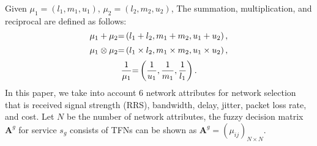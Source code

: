 \documentclass[conference]{IEEEtran}
\begin{document}
\begin{comment}
	\begin{equation}   
	\label{equ1}
	\mu (x) = \left\{ \begin{array}{l}
	\frac{{x - l}}{{m - l}}\;\;,\;l \le x \le m  ,\\
	\frac{{u - x}}{{u - m}}\;\;,m \le x \le u    ,\\
	0\;\;\;\;\;\;\;\;,\rm otherwise     .
	\end{array} \right. 
	\end{equation}content...
\end{comment}
Given $\mu_1=(l_1,m_1,u_1)$, $\mu_2=(l_2,m_2,u_2)$, 
The summation, multiplication, and reciprocal are defined as follows:
\begin{equation}   
\label{equ2}
{\mu _1} + {\mu _2}{\rm{ = }}\left( {{l_1} + {l_2},{m_1} + {m_2},{u_1} + {u_2}} \right) ,
\end{equation}
\begin{equation}   
\label{equ3}
{\mu _1} \otimes {\mu _2}{\rm{ = }}\left( {{l_1} \times {l_2},{m_1} \times {m_2},{u_1} \times {u_2}} \right) ,
\end{equation}
\begin{equation}   
\label{equ4}
\frac{1}{{{\mu _1}}}{\rm{ = }}\left( {\frac{1}{{{u_1}}},\frac{1}{{{m_1}}},\frac{1}{{{l_1}}}} \right)  .
\end{equation}
  In this paper, we take into account 6 network attributes for network selection that is received signal strength (RRS), bandwidth, delay, jitter, packet loss rate, and cost. 
 Let $N$ be the number of network attributes, the fuzzy decision matrix   $\boldsymbol{A}^g$ for service $s_g$ consists of TFNs can be shown as $\boldsymbol{A}^g = {({\mu _{ij}})_{N \times N}}   $.
\end{document}
